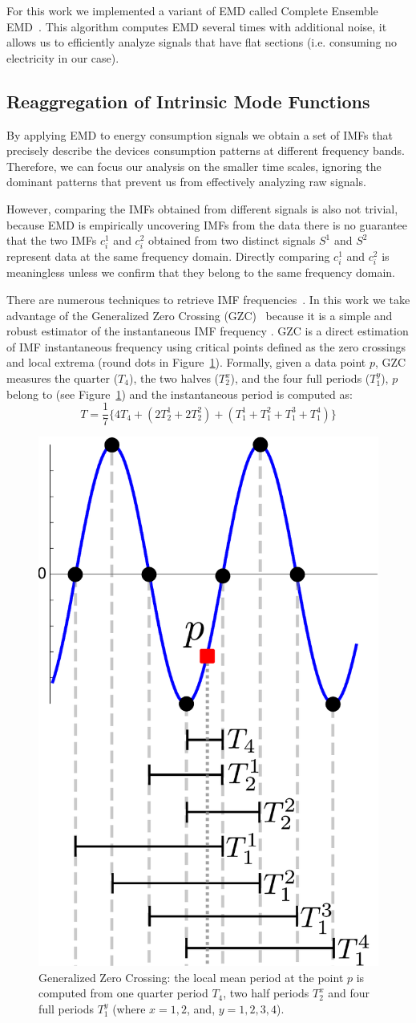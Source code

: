 For this work we implemented a variant of EMD called Complete Ensemble EMD~\cite{torres:icassp2012}.
This algorithm computes EMD several times with additional noise, it allows us to efficiently analyze signals that have 
flat sections (i.e. consuming no electricity in our case). %

\subsection{Reaggregation of Intrinsic Mode Functions} \label{methodo:corr}
By applying EMD to energy consumption signals we obtain a set of IMFs that precisely describe the devices consumption 
patterns at different frequency bands.  Therefore, we can focus our analysis on the smaller time scales, ignoring the dominant 
patterns that prevent us from effectively analyzing raw signals.

However, comparing the IMFs obtained from different signals is also not trivial,
 because EMD is empirically uncovering IMFs from the data there is no guarantee that the two IMFs $c_i^1$ and $c_i^2$ obtained from two distinct signals $S^1$ and $S^2$ represent data at the same frequency domain.
Directly comparing $c_i^1$ and $c_i^2$ is meaningless unless we confirm that they belong to the same frequency domain.

There are numerous techniques to retrieve IMF frequencies~\cite{huang:aada2009}.  
In this work we take advantage of the Generalized Zero Crossing (GZC)~\cite{huang:patent2006} because it is a simple and robust 
estimator of the instantaneous IMF frequency \cite{huang:aada2009}.
GZC is a direct estimation of IMF instantaneous frequency using critical points defined as the zero crossings and local extrema 
(round dots in Figure~\ref{fig:gzc}).
Formally, given a data point $p$, GZC measures the quarter ($T_4$), the two halves ($T_2^x$), and the four full periods ($T_1^y$), $p$   
belong to (see Figure~\ref{fig:gzc}) and the instantaneous period is computed as:
\[T=\frac{1}{7}\{4T_4+(2T_2^1+2T_2^2)+(T_1^1+T_1^2+T_1^3+T_1^4)\}\]

\begin{figure}
\begin{center}
 \includegraphics[width=.25\textwidth]{figs/gzc.pdf}
 \end{center}
 \caption{Generalized Zero Crossing: the local mean period at the point $p$ is computed from one quarter period $T_4$, two half periods $T_2^x$ and four full periods $T_1^y$ (where $x=1, 2$, and, $y=1,2,3,4$).}
 \label{fig:gzc}
\end{figure}

